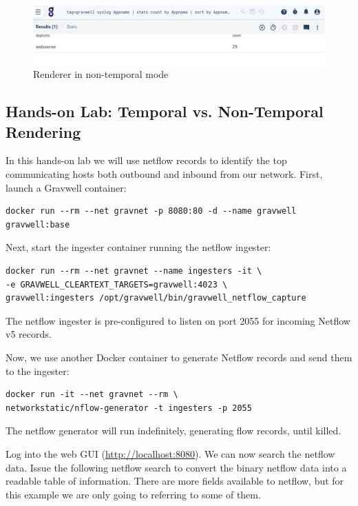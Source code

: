 \begin{figure}
	\includegraphics[width=0.8\linewidth]{images/nontemporal-render.png}
	\caption{Renderer in non-temporal mode}
	\label{fig:nontemporal-render}
\end{figure}

\clearpage
\subsection{Hands-on Lab: Temporal vs. Non-Temporal Rendering}

In this hands-on lab we will use netflow records to identify the top
communicating hosts both outbound and inbound from our network. First, launch
a Gravwell container:

\begin{Verbatim}[breaklines=true]
docker run --rm --net gravnet -p 8080:80 -d --name gravwell gravwell:base
\end{Verbatim}

Next, start the ingester container running the netflow ingester:

\begin{Verbatim}[breaklines=true]
docker run --rm --net gravnet --name ingesters -it \
-e GRAVWELL_CLEARTEXT_TARGETS=gravwell:4023 \
gravwell:ingesters /opt/gravwell/bin/gravwell_netflow_capture
\end{Verbatim}

The netflow ingester is pre-configured to listen on port 2055 for
incoming Netflow v5 records.

Now, we use another Docker container to generate Netflow records and
send them to the ingester:

\begin{Verbatim}[breaklines=true]
docker run -it --net gravnet --rm \
networkstatic/nflow-generator -t ingesters -p 2055
\end{Verbatim}

The netflow generator will run indefinitely, generating flow records,
until killed.

Log into the web GUI (\href{http://localhost:8080}{http://localhost:8080}).
We can now search the netflow data. Issue the following netflow search to convert the binary netflow data
into a readable table of information. There are more fields available to
netflow, but for this example we are only going to referring to some of
them.

